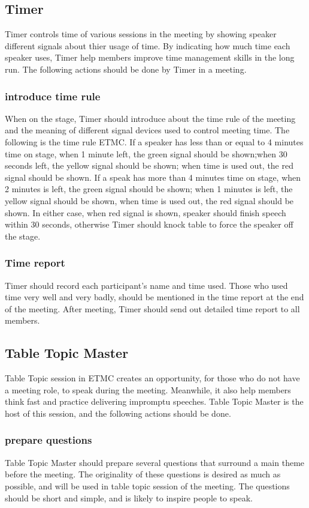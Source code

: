 \subsection{Timer}
Timer controls time of various sessions in the meeting by showing speaker different 
signals about thier usage of time. By indicating how much time each speaker uses, 
Timer help members improve time management skills in the long run. The following 
actions should be done by Timer in a meeting.

\subsubsection{introduce time rule}
When on the stage, Timer should introduce about the time rule of the meeting and 
the meaning of different signal devices used to control meeting time. The following
is the time rule ETMC. If a speaker has less than or equal to 4 minutes time on stage, 
when 1 minute left, the green signal should be shown;when 30 seconds left, the yellow
signal should be shown; when time is used out, the red signal should be shown. If a 
speak has more than 4 minutes time on stage, when 2 minutes is left, the green signal
should be shown; when 1 minutes is left, the yellow signal should be shown, when time
is used out, the red signal should be shown. In either case, when red signal is shown,
speaker should finish speech within 30 seconds, otherwise Timer should knock table to
force the speaker off the stage.

\subsubsection{Time report}
Timer should record each participant's name and time used. Those who used time very 
well and very badly, should be mentioned in the time report at the end of the meeting.
After meeting, Timer should send out detailed time report to all members.

\subsection{Table Topic Master}
Table Topic session in ETMC creates an opportunity, for those who do not have a 
meeting role, to speak during the meeting. Meanwhile, it also help members think fast 
and practice delivering impromptu speeches. Table Topic Master is the host of this 
session, and the following actions should be done.

\subsubsection{prepare questions}
Table Topic Master should prepare several questions that surround a main theme before 
the meeting. The originality of these questions is desired as much as possible, and 
will be used in table topic session of the meeting. The questions should be short and
simple, and is likely to inspire people to speak.

